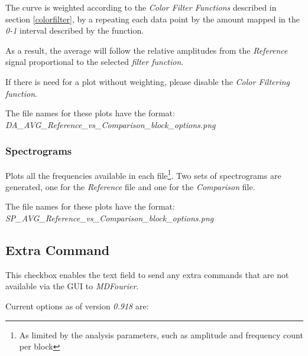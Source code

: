 \documentclass[10pt,a4paper]{report}
\begin{document}
The curve is weighted according to the \textit{Color Filter Functions} described in section \ref{colorfilter}, by a repeating each data point by the amount mapped in the \textit{0-1} interval described by the function.

As a result, the average will follow the relative amplitudes from the \textit{Reference} signal proportional to the selected \textit{filter function}.

If there is need for a plot without weighting, please disable the \textit{Color Filtering function}.

The file names for these plots have the format:\\ \textit{DA\_AVG\_Reference\_vs\_Comparison\_block\_options.png}

\subsubsection{Spectrograms}

Plots all the frequencies available in each file\footnote{As limited by the analysis parameters, such as amplitude and frequency count per block}. Two sets of spectrograms are generated, one for the \textit{Reference} file and one for the \textit{Comparison} file.

The file names for these plots have the format:\\ \textit{SP\_AVG\_Reference\_vs\_Comparison\_block\_options.png}

\subsection{Extra Command}
\label{extracommand}

This checkbox enables the text field to send any extra commands that are not available via the GUI to \textit{MDFourier}. 

Current options as of version \textit{0.918} are:
\end{document}
